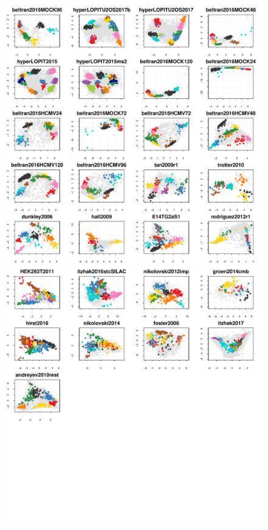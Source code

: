 \documentclass[12pt]{article}\usepackage[]{graphicx}\usepackage[]{color}
\makeatletter
\def\maxwidth{ %
  \ifdim\Gin@nat@width>\linewidth
    \linewidth
  \else
    \Gin@nat@width
  \fi
}
\newenvironment{knitrout}{}{} %
\makeatother
\begin{document}
\begin{figure}[p]
  \centering
\begin{knitrout}
\color{fgcolor}
\includegraphics[width=\maxwidth]{figure/figpca-1} 

\includegraphics[width=\maxwidth]{figure/figpca-2} 


\end{knitrout}
\end{figure}
\end{document}
